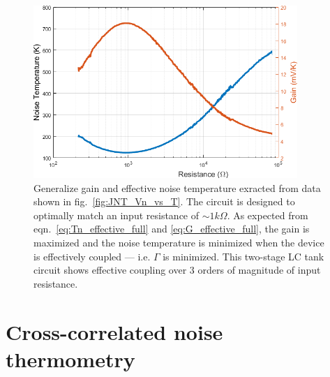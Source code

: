 \begin{figure}
\centering
\includegraphics[width = 100mm]{figures/Johnson_noise_thermometry/G_Tn_vs_R}
\caption{Generalize gain and effective noise temperature exracted from data shown in fig.~\ref{fig:JNT_Vn_vs_T}. The circuit is designed to optimally match an input resistance of ${\sim}1k\Omega$. As expected from eqn.~\ref{eq:Tn_effective_full} and \ref{eq:G_effective_full}, the gain is maximized and the noise temperature is minimized when the device is effectively coupled --- i.e. $\Gamma$ is minimized. This two-stage LC tank circuit shows effective coupling over $3$ orders of magnitude of input resistance.}
\label{fig:JNT_G_Tn_vs_T}
\end{figure}


\section{Cross-correlated noise thermometry}

